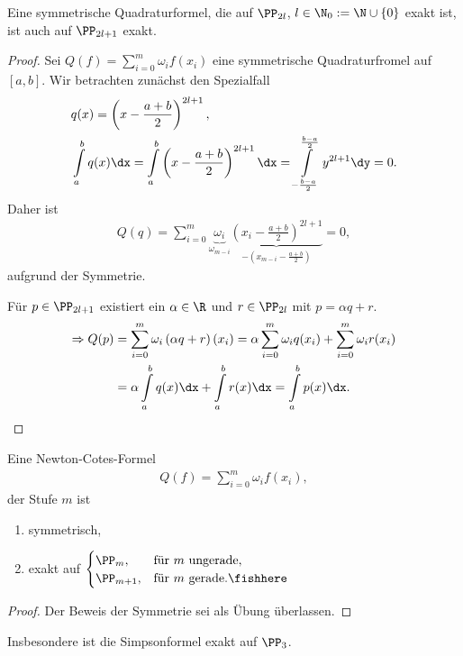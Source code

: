 \begin{prop}
\label{prop:4.4}
Eine symmetrische Quadraturformel, die auf $\PP_{2l}$, $l\in \N_0:=\N\cup\{0\}$
exakt ist, ist auch auf $\PP_{2l+1}$ exakt.\fishhere
\end{prop}
\begin{proof}
Sei $Q(f) = \sum\limits_{i=0}^m \omega_i f(x_i)$ eine symmetrische
Quadraturfromel auf $[a,b]$. Wir betrachten zunächst den Spezialfall
\begin{align*}
&q(x) = \left(x - \frac{a+b}{2}\right)^{2l+1},\\
&\int\limits_{a}^b q(x)\dx = \int\limits_a^b \left(x -
\frac{a+b}{2}\right)^{2l+1} \dx = \int\limits_{-\frac{b-a}{2}}^{\frac{b-a}{2}}
y^{2l+1}\dy = 0.
\end{align*}
Daher ist
\begin{align*}
Q(q) = \sum\limits_{i=0}^m\underbrace{\omega_i}_{\omega_{m-i}}
\underbrace{\left( x_i -
\frac{a+b}{2} \right)^{2l+1}}_{-\left(x_{m-i}-\frac{a+b}{2}\right)} = 0,
\end{align*}
aufgrund der Symmetrie.

Für $p\in\PP_{2l+1}$ existiert ein $\alpha\in\R$ und $r\in\PP_{2l}$ mit $p =
\alpha q + r$.
\begin{align*}
\Rightarrow  Q(p) &= \sum\limits_{i=0}^m \omega_i\left(\alpha q +r \right)(x_i)
= \alpha\sum\limits_{i=0}^m \omega_i q(x_i) + \sum\limits_{i=0}^m \omega_i
r(x_i)\\
&= \alpha \int\limits_a^b q(x)\dx + \int\limits_a^b r(x)\dx = 
\int\limits_a^b p(x)\dx.\qedhere
\end{align*}
\end{proof}
\begin{corn}
Eine Newton-Cotes-Formel
\begin{align*}
Q(f) = \sum\limits_{i=0}^m \omega_i f(x_i),
\end{align*}
der Stufe $m$ ist
\begin{enumerate}[label=(\roman{*})]
  \item symmetrisch,
  \item  exakt auf $
\begin{cases}
\PP_m, & \text{für }m\text{ ungerade},\\
\PP_{m+1}, & \text{für }m\text{ gerade}.\fishhere
\end{cases}
$
\end{enumerate}
\end{corn}
\begin{proof}
Der Beweis der Symmetrie sei als Übung überlassen.\qedhere
\end{proof}
Insbesondere ist die Simpsonformel exakt auf $\PP_3$.

